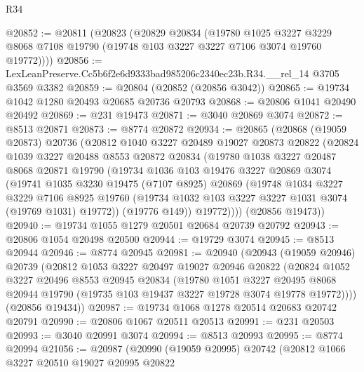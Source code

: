 \begin{lexlean}{R34}
\begin{coremodule}
@20852 := @20811
    (@20823
      (@20829
        @20834
        (@19780
          @1025
          @3227
          @3229
          @8068
          @7108
          @19790
          (@19748 @103 @3227 @3227 @7106 @3074 @19760 @19772))))
@20856 := LexLeanPreserve.Cc5b6f2e6d9333bad985206c2340ec23b.R34.__rel_14 @3705 @3569 @3382
@20859 := @20804 (@20852 (@20856 @3042))
@20865 := @19734 @1042 @1280 @20493 @20685 @20736 @20793
@20868 := @20806 @1041 @20490 @20492
@20869 := @231 @19473
@20871 := @3040 @20869 @3074
@20872 := @8513 @20871
@20873 := @8774 @20872
@20934 := @20865
    (@20868
      (@19059 @20873)
      @20736
      (@20812
        @1040
        @3227
        @20489
        @19027
        @20873
        @20822
        (@20824
          @1039
          @3227
          @20488
          @8553
          @20872
          @20834
          (@19780
            @1038
            @3227
            @20487
            @8068
            @20871
            @19790
            (@19734
              @1036
              @103
              @19476
              @3227
              @20869
              @3074
              (@19741
                @1035
                @3230
                @19475
                (@7107 @8925)
                @20869
                (@19748
                  @1034
                  @3227
                  @3229
                  @7106
                  @8925
                  @19760
                  (@19734 @1032 @103 @3227 @3227 @1031 @3074 (@19769 @1031) @19772))
                (@19776 @149))
              @19772))))
      (@20856 @19473))
@20940 := @19734 @1055 @1279 @20501 @20684 @20739 @20792
@20943 := @20806 @1054 @20498 @20500
@20944 := @19729 @3074
@20945 := @8513 @20944
@20946 := @8774 @20945
@20981 := @20940
    (@20943
      (@19059 @20946)
      @20739
      (@20812
        @1053
        @3227
        @20497
        @19027
        @20946
        @20822
        (@20824
          @1052
          @3227
          @20496
          @8553
          @20945
          @20834
          (@19780
            @1051
            @3227
            @20495
            @8068
            @20944
            @19790
            (@19735 @103 @19437 @3227 @19728 @3074 @19778 @19772))))
      (@20856 @19434))
@20987 := @19734 @1068 @1278 @20514 @20683 @20742 @20791
@20990 := @20806 @1067 @20511 @20513
@20991 := @231 @20503
@20993 := @3040 @20991 @3074
@20994 := @8513 @20993
@20995 := @8774 @20994
@21056 := @20987
    (@20990
      (@19059 @20995)
      @20742
      (@20812
        @1066
        @3227
        @20510
        @19027
        @20995
        @20822

\end{coremodule}
\end{lexlean}
